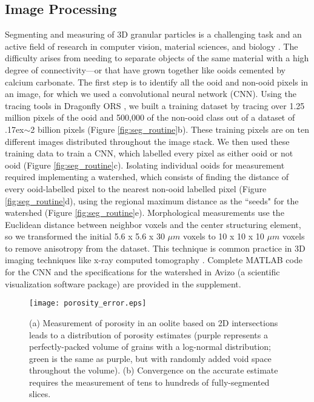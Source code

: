 \documentclass[draft]{agujournal2019}
\begin{document}
\subsection{Image Processing}
Segmenting and measuring of 3D granular particles is a challenging task and an active field of research in computer vision, material sciences, and biology \cite{jaquet2013estimation}. The difficulty arises from needing to separate objects of the same material with a high degree of connectivity---or that have grown together like ooids cemented by calcium carbonate. The first step is to identify all the ooid and non-ooid pixels in an image, for which we used a convolutional neural network (CNN). Using the tracing tools in Dragonfly ORS \cite{DragonflyORS}, we built a training dataset by tracing over  1.25 million pixels of the ooid and 500,000 of the non-ooid class out of a dataset of {\raise.17ex\hbox{$\scriptstyle\sim$}}2 billion pixels (Figure \ref{fig:seg_routine}b). These training pixels are on ten different images distributed throughout the image stack. We then used these training data to train a CNN, which labelled every pixel as either ooid or not ooid (Figure \ref{fig:seg_routine}c). Isolating individual ooids for measurement required implementing a watershed, which consists of finding the distance of every ooid-labelled pixel to the nearest non-ooid labelled pixel (Figure \ref{fig:seg_routine}d), using the regional maximum distance as the ``seeds" for the watershed (Figure \ref{fig:seg_routine}e). Morphological measurements use the Euclidean distance between neighbor voxels and the center structuring element, so we transformed the initial 5.6 x 5.6 x 30 \(\mu m\) voxels to 10 x 10 x 10 \(\mu m\) voxels to remove anisotropy from the dataset. This technique is common practice in 3D imaging techniques like x-ray computed tomography \cite{pierret20023d, capowiez2003characterisation}.  Complete MATLAB code for the CNN and the specifications for the watershed in Avizo (a scientific visualization software package) are provided in the supplement.

\begin{figure}
    \centering
    \texttt{[image: porosity\_error.eps]}
    \caption{(a) Measurement of porosity in an oolite based on 2D intersections leads to a distribution of porosity estimates (purple represents a perfectly-packed volume of grains with a log-normal distribution; green is the same as purple, but with randomly added void space throughout the volume). (b) Convergence on the accurate estimate requires the measurement of tens to hundreds of fully-segmented slices.  }
    \label{fig:porosity_error}
\end{figure}
\end{document}
